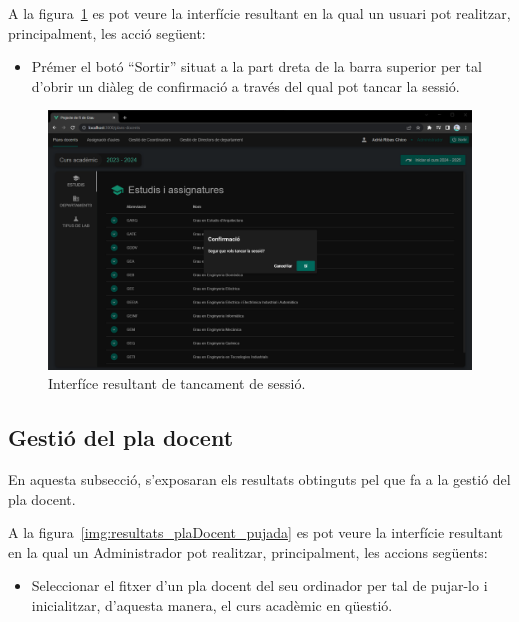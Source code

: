 \documentclass[a4paper,12pt]{ThesisStyle}
\begin{document}
\newpage

A la figura~\ref{img:resultats_auth_logout} es pot veure la interfície resultant en la qual un usuari pot realitzar, principalment, les acció següent:
\begin{itemize}
  \item Prémer el botó ``Sortir'' situat a la part dreta de la barra superior per tal d'obrir un diàleg de confirmació a través del qual pot tancar la sessió.
\end{itemize}

\begin{figure}[H]
  \centering
  \includegraphics[width=\textwidth]{assets/results/auth/logout.png}
  \caption{\label{img:resultats_auth_logout}Interfíce resultant de tancament de sessió.}
\end{figure}

\newpage

\subsection{Gestió del pla docent}
\label{subsec:resultats_plaDocent}

En aquesta subsecció, s'exposaran els resultats obtinguts pel que fa a la gestió del pla docent.

A la figura~\ref{img:resultats_plaDocent_pujada} es pot veure la interfície resultant en la qual un Administrador pot realitzar, principalment, les accions següents:
\begin{itemize}
  \item Seleccionar el fitxer d'un pla docent del seu ordinador per tal de pujar-lo i inicialitzar, d'aquesta manera, el curs acadèmic en qüestió.
\end{itemize}
\end{document}
